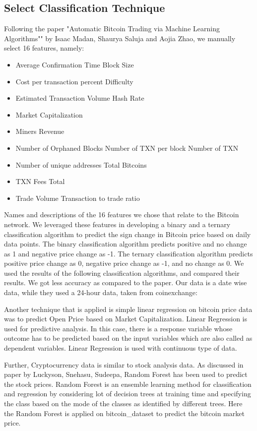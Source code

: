 \documentclass{article}
\begin{document}
\subsection{Select Classification
Technique }
Following the paper "Automatic Bitcoin Trading via Machine Learning Algorithms"" by Isaac Madan, Shaurya Saluja and Aojia Zhao, we manually select 16 features, namely:
\begin{itemize}
\item Average Confirmation Time Block Size
\item Cost per transaction percent Difficulty
\item Estimated Transaction Volume Hash Rate
\item Market Capitalization
\item Miners Revenue
\item Number of Orphaned Blocks Number of TXN per block Number of TXN
\item Number of unique addresses Total Bitcoins
\item TXN Fees Total
\item Trade Volume Transaction to trade ratio
\end{itemize}

Names and descriptions of the 16 features we chose that relate to the Bitcoin network. We leveraged these features in developing a binary and a ternary classification algorithm to predict the sign change in Bitcoin price based on daily data points. The binary classification algorithm predicts positive and no change as 1 and negative price change as -1. The ternary classification algorithm predicts positive price change as 0, negative price change as -1, and no change as 0. We used the results of the following classification algorithms, and compared their results. We got less accuracy as compared to the paper. Our data is a date wise data, while they used a 24-hour data, taken from coinexchange:

Another technique that is applied is simple linear regression on bitcoin price data was to predict Open Price based on Market Capitalization. Linear Regression is used for predictive analysis. In this case, there is a response variable whose outcome has to be predicted based on the input variables which are also called as dependent variables. Linear Regression is used with continuous type of data. 

Further, Cryptocurrency data is similar to stock analysis data. As discussed in paper by Luckyson, Snehasu, Sudeepa, Random Forest has been used to predict the stock prices.
Random Forest is an ensemble learning method for classification and regression by considering lot of decision trees at training time and specifying the class based on the mode of the classes as identified by different trees.
Here the Random Forest is applied on bitcoin\_dataset to predict the bitcoin market price.
\end{document}
